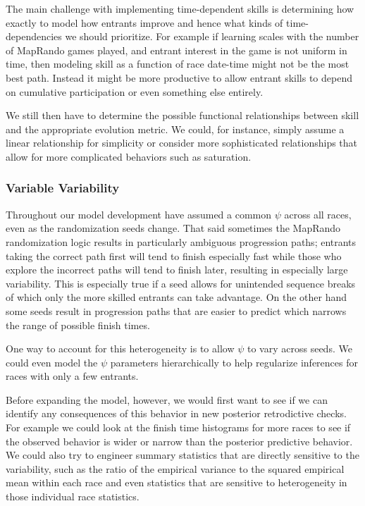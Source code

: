 \documentclass[
  letterpaper,
  DIV=11,
  numbers=noendperiod]{scrartcl}
\begin{document}
The main challenge with implementing time-dependent skills is
determining how exactly to model how entrants improve and hence what
kinds of time-dependencies we should prioritize. For example if learning
scales with the number of MapRando games played, and entrant interest in
the game is not uniform in time, then modeling skill as a function of
race date-time might not be the most best path. Instead it might be more
productive to allow entrant skills to depend on cumulative participation
or even something else entirely.

We still then have to determine the possible functional relationships
between skill and the appropriate evolution metric. We could, for
instance, simply assume a linear relationship for simplicity or consider
more sophisticated relationships that allow for more complicated
behaviors such as saturation.

\subsubsection{Variable Variability}\label{variable-variability}

Throughout our model development have assumed a common \(\psi\) across
all races, even as the randomization seeds change. That said sometimes
the MapRando randomization logic results in particularly ambiguous
progression paths; entrants taking the correct path first will tend to
finish especially fast while those who explore the incorrect paths will
tend to finish later, resulting in especially large variability. This is
especially true if a seed allows for unintended sequence breaks of which
only the more skilled entrants can take advantage. On the other hand
some seeds result in progression paths that are easier to predict which
narrows the range of possible finish times.

One way to account for this heterogeneity is to allow \(\psi\) to vary
across seeds. We could even model the \(\psi\) parameters hierarchically
to help regularize inferences for races with only a few entrants.

Before expanding the model, however, we would first want to see if we
can identify any consequences of this behavior in new posterior
retrodictive checks. For example we could look at the finish time
histograms for more races to see if the observed behavior is wider or
narrow than the posterior predictive behavior. We could also try to
engineer summary statistics that are directly sensitive to the
variability, such as the ratio of the empirical variance to the squared
empirical mean within each race and even statistics that are sensitive
to heterogeneity in those individual race statistics.
\end{document}
